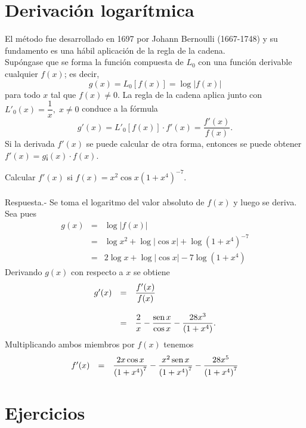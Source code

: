 \section{Derivación logarítmica}
El método fue desarrollado en 1697 por Johann Bernoulli (1667-1748) y su fundamento es una hábil aplicación de la regla de la cadena.\\

Supóngase que se forma la función compuesta de $L_0$ con una función derivable cualquier $f(x)$; es decir,
$$g(x)=L_0\left[f(x)\right] = \log|f(x)|$$
para todo $x$ tal que $f(x)\neq 0$. La regla de la cadena aplica junto con $L'_0(x)=\dfrac{1}{x},\; x\neq 0$ conduce a la fórmula
$$g'(x)=L'_0\left[f(x)\right]\cdot f'(x)=\dfrac{f'(x)}{f(x)}.$$
Si la derivada $f'(x)$ se puede calcular de otra forma, entonces se puede obtener $f'(x)=g¡(x)\cdot f(x)$.

\begin{ejem}
    Calcular $f'(x)$ si $f(x)=x^2\cos x\left(1+x^4\right)^{-7}.$\\\\
	Respuesta.-\; Se toma el logaritmo del valor absoluto de $f(x)$ y luego se deriva.\\
	Sea pues
	$$
	\begin{array}{rcl}
	    g(x)&=&\log|f(x)|\\
		&=&\log x^2 + \log|\cos x| + \log\left(1+x^4\right)^{-7}\\
		&=& 2\log x + \log|\cos x| - 7\log\left(1+x^4\right)
	\end{array}
	$$
	Derivando $g(x)$ con respecto a $x$ se obtiene
	$$
	\begin{array}{rcl}
	    g'(x) &=& \dfrac{f'(x)}{f(x)}\\\\
		  &=& \dfrac{2}{x}-\dfrac{\mathop{\mbox{\normalfont sen}}\nolimits x}{\cos x}-\dfrac{28x^3}{(1+x^4)}.
	\end{array}
	$$
	Multiplicando ambos miembros por $f(x)$ tenemos
	$$
	\begin{array}{rcl}
	    f'(x) &=& \dfrac{2x\cos x}{\left(1+x^4\right)^7}-\dfrac{x^2\mathop{\mbox{\normalfont sen}}\nolimits x}{\left(1+x^4\right)^7}-\dfrac{28x^5}{\left(1+x^4\right)^7}
	\end{array}
	$$

\end{ejem}


\section{Ejercicios}


